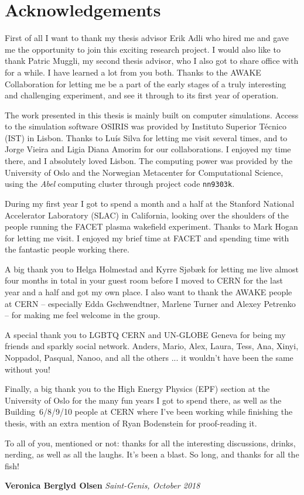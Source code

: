 \chapter*{Acknowledgements}

First of all I want to thank my thesis advisor Erik Adli who hired me and gave me the opportunity to join this exciting research project.
I would also like to thank Patric Muggli, my second thesis advisor, who I also got to share office with for a while.
I have learned a lot from you both.
Thanks to the AWAKE Collaboration for letting me be a part of the early stages of a truly interesting and challenging experiment, and see it through to its first year of operation.

The work presented in this thesis is mainly built on computer simulations.
Access to the simulation software OSIRIS was provided by Instituto Superior Técnico (IST) in Lisbon.
Thanks to Luís Silva for letting me visit several times, and to Jorge Vieira and Ligia Diana Amorim for our collaborations.
I enjoyed my time there, and I absolutely loved Lisbon.
The computing power was provided by the University of Oslo and the Norwegian Metacenter for Computational Science, using the \textit{Abel} computing cluster through project code \texttt{nn9303k}.

During my first year I got to spend a month and a half at the Stanford National Accelerator Laboratory (SLAC) in California, looking over the shoulders of the people running the FACET plasma wakefield experiment.
Thanks to Mark Hogan for letting me visit.
I enjoyed my brief time at FACET and spending time with the fantastic people working there.

A big thank you to Helga Holmestad and Kyrre Sjøbæk for letting me live almost four months in total in your guest room before I moved to CERN for the last year and a half and got my own place.
I also want to thank the AWAKE people at CERN -- especially Edda Gschwendtner, Marlene Turner and Alexey Petrenko -- for making me feel welcome in the group.

A special thank you to LGBTQ CERN and UN-GLOBE Geneva for being my friends and sparkly social network.
Anders, Mario, Alex, Laura, Tess, Ana, Xinyi, Noppadol, Pasqual, Nanoo, and all the others ... it wouldn't have been the same without you!

Finally, a big thank you to the High Energy Physics (EPF) section at the University of Oslo for the many fun years I got to spend there, as well as the Building~6/8/9/10 people at CERN where I've been working while finishing the thesis, with an extra mention of Ryan Bodenstein for proof-reading it.

To all of you, mentioned or not: thanks for all the interesting discussions, drinks, nerding, as well as all the laughs.
It's been a blast.
So long, and thanks for all the fish!

\vfill
\null\hfill\textbf{Veronica Berglyd Olsen}
\newline
\null\hfill\textit{Saint-Genis, October 2018}
